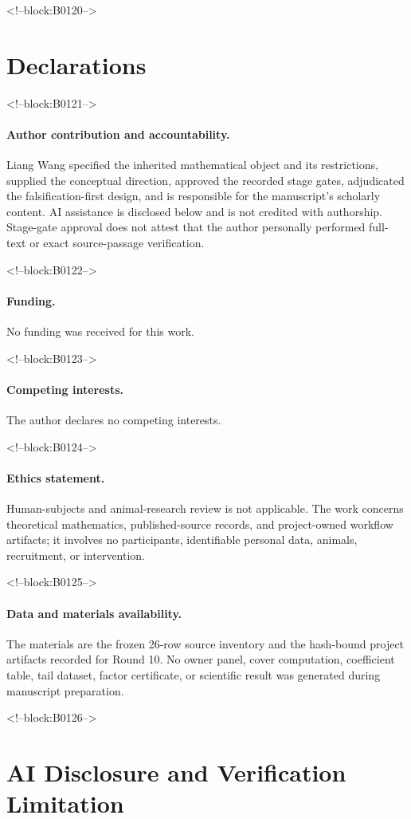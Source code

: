 \documentclass[11pt]{article}
\begin{document}
<!--block:B0120-->
\section*{Declarations}

<!--block:B0121-->
\paragraph{Author contribution and accountability.}
Liang Wang specified the inherited mathematical object and its
restrictions, supplied the conceptual direction, approved the recorded
stage gates, adjudicated the falsification-first design, and is
responsible for the manuscript's scholarly content. AI assistance is
disclosed below and is not credited with authorship. Stage-gate approval
does not attest that the author personally performed full-text or exact
source-passage verification.

<!--block:B0122-->
\paragraph{Funding.} No funding was received for this work.

<!--block:B0123-->
\paragraph{Competing interests.} The author declares no competing
interests.

<!--block:B0124-->
\paragraph{Ethics statement.} Human-subjects and animal-research review
is not applicable. The work concerns theoretical mathematics,
published-source records, and project-owned workflow artifacts; it
involves no participants, identifiable personal data, animals,
recruitment, or intervention.

<!--block:B0125-->
\paragraph{Data and materials availability.} The materials are the
frozen 26-row source inventory and the hash-bound project artifacts
recorded for Round 10. No owner panel, cover computation, coefficient
table, tail dataset, factor certificate, or scientific result was
generated during manuscript preparation.

<!--block:B0126-->
\hypertarget{ai-disclosure-and-verification-limitation}{%
\section*{AI Disclosure and Verification
Limitation}\label{ai-disclosure-and-verification-limitation}}
\end{document}
